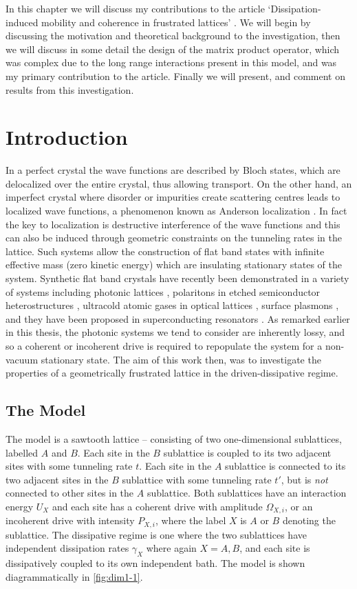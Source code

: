 In this chapter we will discuss my contributions to the article `Dissipation-induced mobility and coherence in frustrated lattices' \cite{OBH17}. We will begin by discussing the motivation and theoretical background to the investigation, then we will discuss in some detail the design of the matrix product operator, which was complex due to the long range interactions present in this model, and was my primary contribution to the article. Finally we will present, and comment on results from this investigation.

\section{Introduction}
In a perfect crystal the wave functions are described by Bloch states, which are delocalized over the entire crystal, thus allowing transport. On the other hand, an imperfect crystal where disorder or impurities create scattering centres leads to localized wave functions, a phenomenon known as Anderson localization \cite{Anderson58,LR85,SSC13}. In fact the key to localization is destructive interference of the wave functions and this can also be induced through geometric constraints on the tunneling rates in the lattice. Such systems allow the construction of flat band states with infinite effective mass (zero kinetic energy) which are insulating stationary states of the system. Synthetic flat band crystals have recently been demonstrated in a variety of systems including photonic lattices \cite{GuzmanSilvaEA14,VicencioEA15,MukherjeeEA15,MT15}, polaritons in etched semiconductor heterostructures \cite{JacqminEA14,BabouxEA16}, ultracold atomic gases in optical lattices \cite{TOINNT15}, surface plasmons \cite{NONK12,KUNNK16}, and they have been proposed in superconducting resonators \cite{YangEA16}. As remarked earlier in this thesis, the photonic systems we tend to consider are inherently lossy, and so a coherent or incoherent drive is required to repopulate the system for a non-vacuum stationary state. The aim of this work then, was to investigate the properties of a geometrically frustrated lattice in the driven-dissipative regime.  

\subsection{The Model}
The model is a sawtooth lattice -- consisting of two one-dimensional sublattices, labelled \(A\) and \(B\). Each site in the \(B\) sublattice is coupled to its two adjacent sites with some tunneling rate \(t\). Each site in the \(A\) sublattice is connected to its two adjacent sites in the \(B\) sublattice with some tunneling rate \(t'\), but is \emph{not} connected to other sites in the \(A\) sublattice. Both sublattices have an interaction energy \(U_{X}\) and each site has a coherent drive with amplitude \(\Omega_{X,i}\), or an incoherent drive with intensity \(P_{X,i}\), where the label \(X\) is \(A\) or \(B\) denoting the sublattice. The dissipative regime is one where the two sublattices have independent dissipation rates \(\gamma_{X}\) where again \(X = A,B\), and each site is dissipatively coupled to its own independent bath. The model is shown diagrammatically in \cref{fig:dim1-1}.

